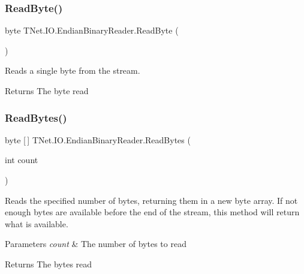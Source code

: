 \subsubsection{\texorpdfstring{Read\+Byte()}{ReadByte()}}
{\footnotesize\ttfamily byte T\+Net.\+I\+O.\+Endian\+Binary\+Reader.\+Read\+Byte (\begin{DoxyParamCaption}{ }\end{DoxyParamCaption})}



Reads a single byte from the stream. 

\begin{DoxyReturn}{Returns}
The byte read
\end{DoxyReturn}
\mbox{\label{class_t_net_1_1_i_o_1_1_endian_binary_reader_ad06f8519f7c57b123ec9ba2616f35440}} 
\subsubsection{\texorpdfstring{Read\+Bytes()}{ReadBytes()}}
{\footnotesize\ttfamily byte \mbox{[}$\,$\mbox{]} T\+Net.\+I\+O.\+Endian\+Binary\+Reader.\+Read\+Bytes (\begin{DoxyParamCaption}\item[{int}]{count }\end{DoxyParamCaption})}



Reads the specified number of bytes, returning them in a new byte array. If not enough bytes are available before the end of the stream, this method will return what is available. 


\begin{DoxyParams}{Parameters}
{\em count} & The number of bytes to read\\
\hline
\end{DoxyParams}
\begin{DoxyReturn}{Returns}
The bytes read
\end{DoxyReturn}
\mbox{\label{class_t_net_1_1_i_o_1_1_endian_binary_reader_aa192e348d6dc146c53a7aa9bd218c197}} 
